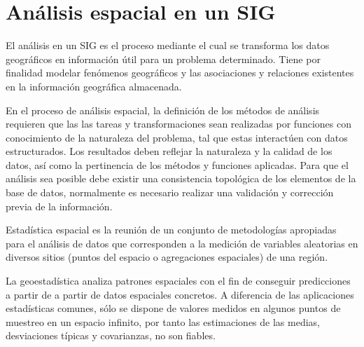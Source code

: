 \section{Análisis espacial en un SIG}
\label{sec:cap2-analisis-espacial-sig}

El análisis en un SIG es el proceso mediante el cual se transforma los datos geográficos en información útil
para un problema determinado. Tiene por finalidad modelar fenómenos geográficos y las asociaciones y relaciones 
existentes en la información geográfica almacenada. 

En el proceso de análisis espacial, la definición de los métodos de análisis requieren que las las tareas y transformaciones 
sean realizadas por funciones con conocimiento de la naturaleza del problema, tal que estas interactúen con datos 
estructurados. Los resultados deben reflejar la naturaleza y la calidad de los datos, así como la pertinencia de los métodos
y funciones aplicadas. Para que el análisis sea posible debe existir una consistencia topológica de los elementos de la 
base de datos, normalmente es necesario realizar una validación y corrección previa de la información.

Estadística espacial es la reunión de un conjunto de metodologías apropiadas para el análisis de datos que corresponden 
a la medición de variables aleatorias en diversos sitios (puntos del espacio o agregaciones espaciales) de una 
región\cite{rgeraldoGeoestasistica}. 

La geoestadística analiza patrones espaciales con el fin de conseguir predicciones a partir de
a partir de datos espaciales concretos. A diferencia de las aplicaciones estadísticas comunes, sólo se dispone de valores
medidos en algunos puntos de muestreo en un espacio infinito, por tanto las estimaciones de las medias, desviaciones típicas 
y covarianzas, no son fiables.

